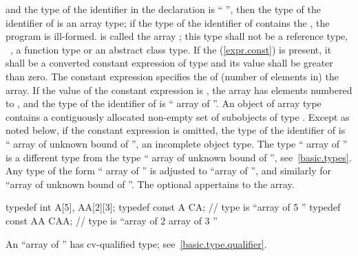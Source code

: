 and the type of the identifier in the declaration
is
``
'',
then the type of the identifier of
is an array type; if the type of the identifier of 
contains the  ,
the program is ill-formed.
is called the array
;
this type shall not be a reference type, \cv{}~,
a function type or an abstract class type.
%
If the
(\ref{expr.const}) is present, it shall be a converted constant
expression of type  and
its value shall be greater than zero.
The constant expression specifies the
%
%
of (number of elements in) the array.
If the value of the constant expression is
,
the array has
elements numbered
to
,
and the type of the identifier of
is `` array of
''.
An object of array type contains a contiguously allocated non-empty set of
subobjects of type
.
Except as noted below, if
the constant expression is omitted, the type of the identifier of
is `` array of unknown bound of
'',
an incomplete object type.
The type `` array of
''
is a different type from the type
`` array of unknown bound of
'',
see~\ref{basic.types}.
Any type of the form
`` array of
''
is adjusted to
``array of
'',
and similarly for
``array of unknown bound of
''.
The optional  appertains to the array.
\begin{example}

\begin{codeblock}
typedef int A[5], AA[2][3];
typedef const A CA;             // type is ``array of 5 ''
typedef const AA CAA;           // type is ``array of 2 array of 3 ''
\end{codeblock}
\end{example}
\begin{note}
An
``array of
''
has cv-qualified type; see~\ref{basic.type.qualifier}.
\end{note}

